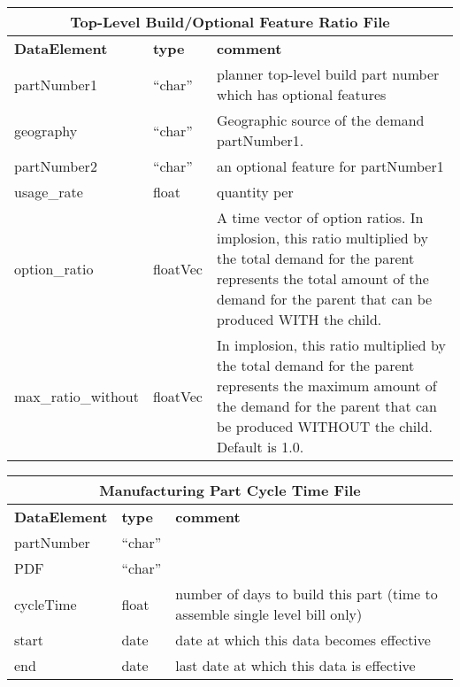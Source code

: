 \begin{tabular}{llp{4in}}
\multicolumn{3}{c}{{\bf Top-Level Build/Optional Feature Ratio File}}\\ \hline\hline
{\bf DataElement} &  {\bf type}  &   {\bf comment} \\ \hline
partNumber1 &  ``char'' &    planner top-level build part number which has optional features \\
geography   &    ``char'' &    Geographic source of the demand partNumber1. \\
partNumber2 &  ``char''  &   an optional feature for partNumber1  \\
usage\_rate    &    float  &    quantity per \\
option\_ratio   &   floatVec    &  A time vector of option ratios.  In implosion, this ratio
                             multiplied by the total demand for the
                             parent represents the total amount of the demand for
                             the parent that can be produced WITH
                             the child. \\
max\_ratio\_without & floatVec   & In implosion, this ratio multiplied by
                             the total demand for the parent
                             represents the maximum amount of the demand for the parent
                             that can be produced WITHOUT the child.
                             Default is 1.0.  
\end{tabular}

\vspace{.5in}

\begin{tabular}{llp{4in}}
\multicolumn{3}{c}{{\bf Manufacturing Part Cycle Time File}}\\ \hline\hline
{\bf DataElement} &  {\bf type}  &   {\bf comment} \\ \hline
partNumber & ``char'' \\
PDF   & ``char''  \\
cycleTime    &   float &   number of days to build this  part (time
                         to assemble single level bill only) \\
start        &   date &    date at which this data becomes effective  \\
end         &    date  &   last date at which this data is effective  
\end{tabular} 

